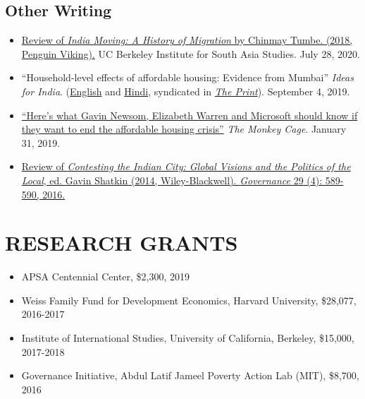 \documentclass[10pt]{article}
\begin{document}
\subsection*{Other Writing}	
\begin{itemize}
\item[]\href{https://southasia.berkeley.edu/sites/default/files/shared/India_Center/India_Moving.pdf}{Review of \textit{India Moving: A History of Migration} by Chinmay Tumbe. (2018, Penguin Viking).}  UC Berkeley Institute for South Asia Studies. July 28, 2020.
\item[]``Household-level effects of affordable housing: Evidence from Mumbai''  \textit{Ideas for India}. (\href{https://www.ideasforindia.in/topics/poverty-inequality/household-level-effects-of-affordable-housing-evidence-from-mumbai.html}{English} and \href{https://www.ideasforindia.in/topics/poverty-inequality/household-level-effects-of-affordable-housing-evidence-from-mumbai-hindi.html}{Hindi}, syndicated in \href{https://theprint.in/opinion/mumbai-residents-win-govt-housing-lottery-and-spend-more-on-kids-education-jobs-study/290485/}{\textit{The Print}}). September 4, 2019.

\item[]\href{https://www.washingtonpost.com/news/monkey-cage/wp/2019/01/31/heres-what-gavin-newsom-elizabeth-warren-and-microsoft-should-know-if-want-to-end-the-affordable-housing-crisis/?tid=sm_tw_cage}{``Here's what Gavin Newsom, Elizabeth Warren and Microsoft should know if they want to end the affordable housing crisis''} \textit{The Monkey Cage}. January 31, 2019. 
\item[] \href{http://onlinelibrary.wiley.com/doi/10.1111/gove.12241/abstract}{Review of \textit{Contesting the Indian City: Global Visions and the Politics of the Local}, ed. Gavin Shatkin (2014, Wiley-Blackwell). \textit{Governance} 29 (4): 589-590, 2016.} \

\end{itemize}
\vspace{3mm}
\section*{RESEARCH GRANTS}

\begin{itemize}[nosep]
\item[] APSA Centennial Center, \$2,300, 2019

\item[] Weiss Family Fund for Development Economics, Harvard University, \$28,077, 2016-2017
	 
\item[]Institute of International Studies, University of California, Berkeley, \$15,000, 2017-2018
\item[] Governance Initiative, Abdul Latif Jameel Poverty Action Lab (MIT), \$8,700, 2016	
\end{itemize}
\end{document}
